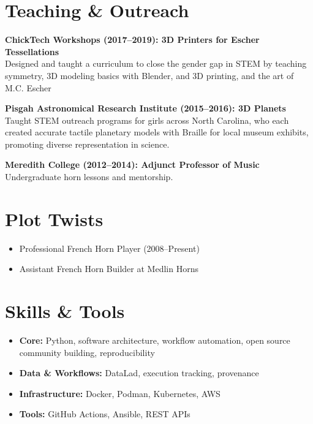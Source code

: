 \documentclass[11pt,letterpaper]{article}
\begin{document}
\section{Teaching \& Outreach}

\textbf{ChickTech Workshops (2017--2019): 3D Printers for Escher Tessellations}\\
Designed and taught a curriculum to close the gender gap in STEM by teaching symmetry, 3D modeling basics with Blender, and 3D printing, and the art of M.C. Escher

\textbf{Pisgah Astronomical Research Institute (2015--2016): 3D Planets}\\
Taught STEM outreach programs for girls across North Carolina, who each created accurate tactile planetary models with Braille for local museum exhibits, promoting diverse representation in science.

\textbf{Meredith College (2012--2014): Adjunct Professor of Music}\\
Undergraduate horn lessons and mentorship.

\section{Plot Twists}

\begin{itemize}
  \item Professional French Horn Player (2008--Present)
  \item Assistant French Horn Builder at Medlin Horns
\end{itemize}

\section{Skills \& Tools}

\begin{itemize}
  \item \textbf{Core:} Python, software architecture, workflow automation, open source community building, reproducibility
  \item \textbf{Data \& Workflows:} DataLad, execution tracking, provenance
  \item \textbf{Infrastructure:} Docker, Podman, Kubernetes, AWS
  \item \textbf{Tools:} GitHub Actions, Ansible, REST APIs
\end{itemize}
\end{document}
